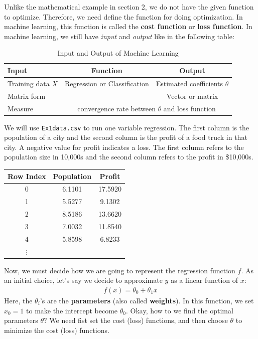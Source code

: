 \documentclass[12pt]{article}
\theoremstyle{definition}
\numberwithin{equation}{section}
\numberwithin{figure}{section}
\numberwithin{table}{section}
\begin{document}
Unlike the mathematical example in section 2, we do not have the given function to optimize. Therefore, we need define the function for doing optimization. In machine learning, this function is called the \textbf{cost function} or \textbf{loss function}. In machine learning, we still have \textit{input} and \textit{output} like in the following table:
\begin{table}[H]
  \centering
  \caption{Input and Output of Machine Learning}
  \begin{tabular}{lcc}
    \hline
    \hline
    Input & Function &Output  \\
    \hline
    Training data $X$ & Regression or Classification & Estimated coefficients $\theta$\\
    Matrix form & & Vector or matrix  \\
    \hline
    Measure & \multicolumn{2}{c}{convergence rate between $\theta$ and loss function} \\
    \hline
  \end{tabular}
\end{table}

We will use \texttt{Ex1data.csv} to run one variable regression. The first column is the population of a city and the second column is the profit of a food truck in that city. A negative value for profit indicates a loss. The first column refers to the population size in 10,000s and the second column refers to the profit in \$10,000s.
\begin{table}[H]
  \centering
  \begin{tabular}{c|c|c}
  Row Index  & Population	& Profit \\
    \hline
0	&6.1101 &	17.5920 \\
1	&5.5277&	9.1302 \\
2	&8.5186&	13.6620 \\
3	&7.0032	&11.8540 \\
4	&5.8598&	6.8233 \\
$\vdots$ & \\
\hline
  \end{tabular}
\end{table}

Now, we must decide how we are going to represent the regression function $f$. As an initial choice, let's say we decide to approximate $y$ as a linear function of $x$:
\begin{align}
  f(x) = \theta_0 + \theta_1 x
\end{align}
Here, the $\theta_i$'s are the \textbf{parameters} (also called \textbf{weights}). In this function, we set $x_0 = 1$ to make the intercept become $\theta_0$. Okay, how to we find the optimal parameters $\theta$? We need fist set the cost (loss) functions, and then choose $\theta$ to minimize the cost (loss) functions.
\end{document}

